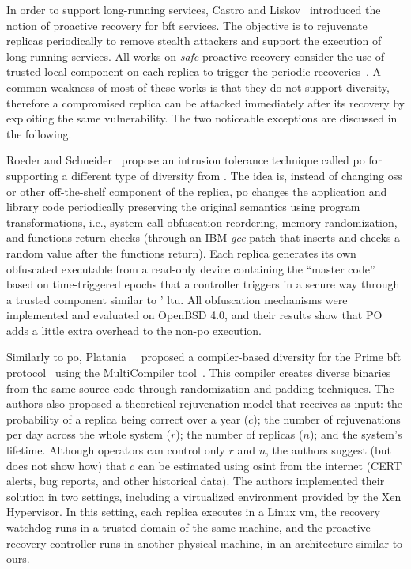 In order to support long-running services, Castro and Liskov~\cite{Castro:2002} introduced the notion of proactive recovery for \gls{bft} services. 
The objective is to rejuvenate replicas periodically to remove stealth attackers and support the execution of long-running services. 
All works on \emph{safe} proactive recovery consider the use of trusted local component on each replica to trigger the periodic recoveries~\cite{Castro:2002,Sousa:2010,Roeder:2010,Platania:2014,Distler:2011}.
A common weakness of most of these works is that they do not support diversity, therefore a compromised replica can be attacked immediately after its recovery by exploiting the same vulnerability.
The two noticeable exceptions are discussed in the following.

Roeder and Schneider~\cite{Roeder:2010} propose an intrusion tolerance technique called \gls{po} for supporting a different type of diversity from \system.
The idea is, instead of changing \glspl{os} or other off-the-shelf component of the replica, \gls{po} changes the application and library code periodically preserving the original semantics using program transformations, i.e., system call obfuscation reordering, memory randomization, and functions return checks (through an IBM \textit{gcc} patch that inserts and checks a random value after the functions return).
Each replica generates its own obfuscated executable from a read-only device containing the ``master code'' based on time-triggered epochs that a controller triggers in a secure way through a trusted component similar to \system' \gls{ltu}.
All obfuscation mechanisms were implemented and evaluated on OpenBSD 4.0, and their results show that PO adds a little extra overhead to the non-\gls{po} execution.

Similarly to \gls{po}, Platania~\etal{}~\cite{Platania:2014} proposed a compiler-based diversity for the Prime \gls{bft} protocol~\cite{Amir:2011} using the MultiCompiler tool~\cite{Homescu:2013}. 
This compiler creates diverse binaries from the same source code through randomization and padding techniques.
The authors also proposed a theoretical rejuvenation model that receives as input: the probability of a replica being correct over a year ($c$); the number of rejuvenations per day across the whole system ($r$); the number of replicas ($n$); and the system's lifetime. 
Although operators can control only $r$ and $n$, the authors suggest (but does not show how) that $c$ can be estimated using \gls{osint} from the internet (CERT alerts, bug reports, and other historical data).
The authors implemented their solution in two settings, including a virtualized environment provided by the Xen Hypervisor.
In this setting, each replica executes in a Linux \gls{vm}, the recovery watchdog runs in a trusted domain of the same machine, and the proactive-recovery controller runs in another physical machine, in an architecture similar to ours.


